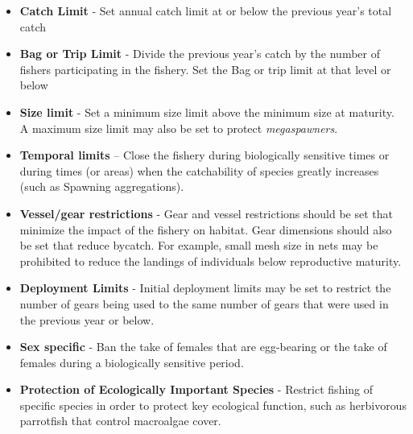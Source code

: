 \documentclass[]{book}
\begin{document}
\begin{itemize}
\item
  \textbf{Catch Limit} - Set annual catch limit at or below the previous
  year's total catch
\item
  \textbf{Bag or Trip Limit} - Divide the previous year's catch by the
  number of fishers participating in the fishery. Set the Bag or trip
  limit at that level or below
\item
  \textbf{Size limit} - Set a minimum size limit above the minimum size
  at maturity. A maximum size limit may also be set to protect
  \emph{megaspawners}.
\item
  \textbf{Temporal limits} -- Close the fishery during biologically
  sensitive times or during times (or areas) when the catchability of
  species greatly increases (such as Spawning aggregations).
\item
  \textbf{Vessel/gear restrictions} - Gear and vessel restrictions
  should be set that minimize the impact of the fishery on habitat. Gear
  dimensions should also be set that reduce bycatch. For example, small
  mesh size in nets may be prohibited to reduce the landings of
  individuals below reproductive maturity.
\item
  \textbf{Deployment Limits} - Initial deployment limits may be set to
  restrict the number of gears being used to the same number of gears
  that were used in the previous year or below.
\item
  \textbf{Sex specific} - Ban the take of females that are egg-bearing
  or the take of females during a biologically sensitive period.
\item
  \textbf{Protection of Ecologically Important Species} - Restrict
  fishing of specific species in order to protect key ecological
  function, such as herbivorous parrotfish that control macroalgae
  cover.
\end{itemize}
\end{document}
